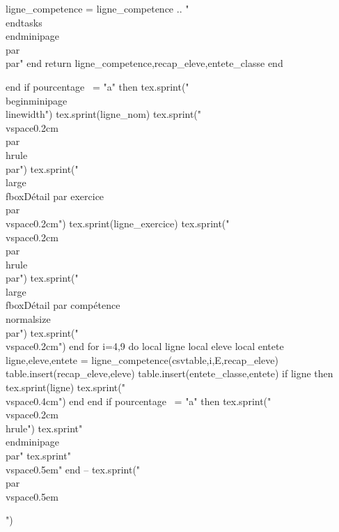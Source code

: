 \documentclass{article}
\begin{document}
\begin{luacode*}
{                    ligne_competence = ligne_competence .. "\\end{tasks}\\end{minipage}\\par\\par"
                end
                return ligne_competence,recap_eleve,entete_classe
            end
            
        end
            if pourcentage ~= "a" then
                tex.sprint("\\begin{minipage}{\\linewidth}")
                tex.sprint(ligne_nom)
                tex.sprint("\\vspace{0.2cm}\\par\\hrule\\par")
                tex.sprint("\\large\\fbox{Détail par exercice}\\par\\vspace{0.2cm}")
                tex.sprint(ligne_exercice)
                tex.sprint("\\vspace{0.2cm}\\par\\hrule\\par")
                tex.sprint("\\large\\fbox{Détail par compétence}\\normalsize\\par")
                tex.sprint("\\vspace{0.2cm}")
            end
            for i=4,9 do
            local ligne
            local eleve
            local entete
            ligne,eleve,entete = ligne_competence(csvtable,i,E,recap_eleve)
            table.insert(recap_eleve,eleve)
            table.insert(entete_classe,entete)
                if ligne then
                    tex.sprint(ligne)
                    tex.sprint("\\vspace{0.4cm}")
                end
            end
                if pourcentage ~= "a" then
            tex.sprint("\\vspace{0.2cm}\\hrule")
            tex.sprint{"\\end{minipage}\\par"}
            tex.sprint{"\\vspace{0.5em}"}
            end
            -- tex.sprint("\\par\\vspace{0.5em}\\\par")     
}
\end{luacode*}
\end{document}
